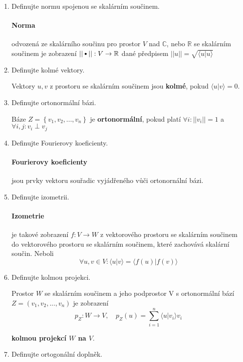 \documentclass[10pt,a4paper]{article}
\newcommand\sbullet[1][.5]{\mathbin{\vcenter{\hbox{\scalebox{#1}{$\bullet$}}}}}
\theoremstyle{plain}
\theoremstyle{definition}
\begin{document}
\begin{enumerate}
\item Definujte normu spojenou se skalárním součinem.

\paragraph{Norma} odvozená ze skalárního součinu pro prostor $V$ nad $\mathbb{C}$, nebo $\mathbb{R}$ se skalárním součinem je zobrazení $|| \sbullet[.75]|| : V \to \mathbb{R}$ dané předpisem $||u|| = \sqrt{\langle u | u \rangle}$

\item Definujte kolmé vektory.

Vektory $u,v$ z prostoru se skalárním součinem jsou \textbf{kolmé}, pokud $\langle u | v \rangle = 0$. 

\item Definujte ortonormální bázi.

Báze $Z = \left\lbrace v_1, v_2, ..., v_n \right\rbrace$ je \textbf{ortonormální}, pokud platí $ \forall i: ||v_i|| = 1 $ a $ \forall i,j: v_i \perp v_j $

\item Definujte Fourierovy koeficienty.

\paragraph{Fourierovy koeficienty} jsou prvky vektoru souřadic vyjádřeného vůči ortonornální bázi.

\item Definujte izometrii.

\paragraph{Izometrie} je takové zobrazení $f: V \to W$ z vektorového prostoru se skalárním součinem do vektorového prostoru se skalárním součinem, které zachovává skalární součin. Neboli \[\forall u,v \in V: \langle u | v \rangle = \langle f(u) | f(v) \rangle\]

\item Definujte kolmou projekci.

Prostor $W$ se skalárním součinem a jeho podprostor V s ortonormální bází  $Z = ( v_1, v_2, ..., v_n ) $ je zobrazení 
\[ p_Z: W \to V,\quad p_Z(u) = \sum^n_{i=1} \langle u|v_i \rangle v_i \]

\textbf{kolmou projekcí $W$ na $V$}.

\item Definujte ortogonální doplněk.


\end{enumerate}
\end{document}
